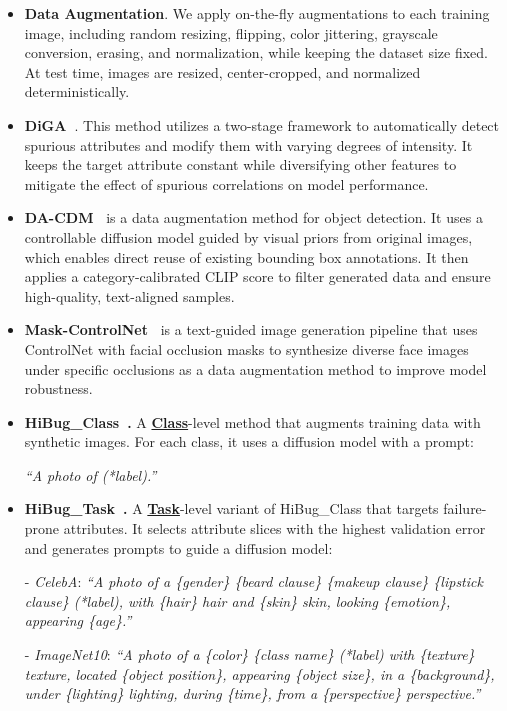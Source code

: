 \documentclass[10pt]{article} %
\begin{document}
\begin{itemize}
\item \textbf{Data Augmentation}. We apply on-the-fly augmentations to each training image, including random resizing, flipping, color jittering, grayscale conversion, erasing, and normalization, while keeping the dataset size fixed. At test time, images are resized, center-cropped, and normalized deterministically.

\item \textbf{DiGA~\citep{zhang2024distributionally}}. This method utilizes a two-stage framework to automatically detect spurious attributes and modify them with varying degrees of intensity. It keeps the target attribute constant while diversifying other features to mitigate the effect of spurious correlations on model performance.


\item \textbf{DA-CDM~\citep{fang2024data}} is a data augmentation method for object detection. It uses a controllable diffusion model guided by visual priors from original images, which enables direct reuse of existing bounding box annotations. It then applies a category-calibrated CLIP score to filter generated data and ensure high-quality, text-aligned samples.
\item \textbf{Mask-ControlNet~\citep{huang2024data}} is a text-guided image generation pipeline that uses ControlNet with facial occlusion masks to synthesize diverse face images under specific occlusions as a data augmentation method to improve model robustness.

    \item \textbf{HiBug\_Class~\citep{chen2023hibug}.}  
    A \underline{\textbf{Class}}-level method that augments training data with synthetic images. For each class, it uses a diffusion model with a prompt:

    \textit{``A photo of (*label).''}

    \item \textbf{HiBug\_Task~\citep{chen2023hibug}.}  
    A \underline{\textbf{Task}}-level variant of HiBug\_Class that targets failure-prone attributes. It selects attribute slices with the highest validation error and generates prompts to guide a diffusion model:

    - \textit{CelebA}:  
    \textit{``A photo of a \{gender\} \{beard clause\} \{makeup clause\} \{lipstick clause\} (*label), with \{hair\} hair and \{skin\} skin, looking \{emotion\}, appearing \{age\}.''}

    - \textit{ImageNet10}:  
    \textit{``A photo of a \{color\} \{class name\} (*label) with \{texture\} texture, located \{object position\}, appearing \{object size\}, in a \{background\}, under \{lighting\} lighting, during \{time\}, from a \{perspective\} perspective.''}


\end{itemize}
\end{document}
